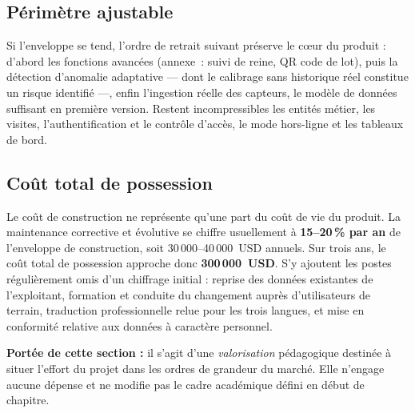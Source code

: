 \subsection{Périmètre ajustable}
Si l'enveloppe se tend, l'ordre de retrait suivant préserve le c\oe ur du
produit : d'abord les fonctions avancées (annexe~: suivi de reine, QR code de
lot), puis la détection d'anomalie adaptative --- dont le calibrage sans
historique réel constitue un risque identifié ---, enfin l'ingestion réelle des
capteurs, le modèle de données suffisant en première version. Restent
incompressibles les entités métier, les visites, l'authentification et le
contrôle d'accès, le mode hors-ligne et les tableaux de bord.

\subsection{Coût total de possession}
Le coût de construction ne représente qu'une part du coût de vie du produit. La
maintenance corrective et évolutive se chiffre usuellement à
\textbf{15--20\,\% par an} de l'enveloppe de construction, soit
30\,000--40\,000~USD annuels. Sur trois ans, le coût total de possession
approche donc \textbf{300\,000~USD}. S'y ajoutent les postes régulièrement omis
d'un chiffrage initial : reprise des données existantes de l'exploitant,
formation et conduite du changement auprès d'utilisateurs de terrain,
traduction professionnelle relue pour les trois langues, et mise en conformité
relative aux données à caractère personnel.

\begin{encadre}
\textbf{Portée de cette section :} il s'agit d'une \emph{valorisation}
pédagogique destinée à situer l'effort du projet dans les ordres de grandeur du
marché. Elle n'engage aucune dépense et ne modifie pas le cadre académique
défini en début de chapitre.
\end{encadre}

